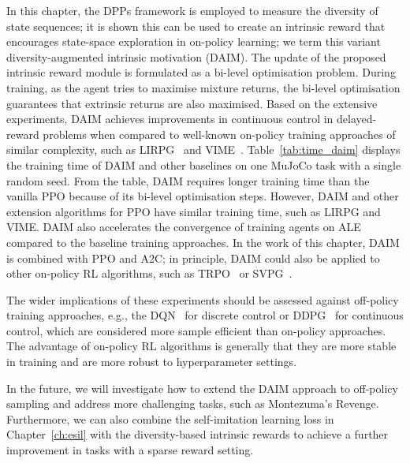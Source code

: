 In this chapter, the DPPs framework is employed to measure the diversity of state sequences; it is shown this can be used to create an intrinsic reward that encourages state-space exploration in on-policy learning; we term this variant diversity-augmented intrinsic motivation (DAIM). The update of the proposed intrinsic reward module is formulated as a bi-level optimisation problem. During training, as the agent tries to maximise mixture returns, the bi-level optimisation guarantees that extrinsic returns are also maximised. Based on the extensive experiments, DAIM achieves improvements in continuous control in delayed-reward problems when compared to well-known on-policy training approaches of similar complexity, such as LIRPG~\cite{zheng2018learning} and VIME~\cite{NIPS2016_abd81528}. Table~\ref{tab:time_daim} displays the training time of DAIM and other baselines on one MuJoCo task with a single random seed. From the table, DAIM requires longer training time than the vanilla PPO because of its bi-level optimisation steps. However, DAIM and other extension algorithms for PPO have similar training time, such as LIRPG and VIME. DAIM also accelerates the convergence of training agents on ALE compared to the baseline training approaches. In the work of this chapter, DAIM is combined with PPO and A2C; in principle, DAIM could also be applied to other on-policy RL algorithms, such as TRPO~\cite{schulman2015trust} or SVPG~\cite{liu2017stein}. 

The wider implications of these experiments should be assessed against off-policy training approaches, e.g., the DQN~\cite{mnih2015human} for discrete control or DDPG~\cite{lillicrap2015continuous} for continuous control, which are considered more sample efficient than on-policy approaches. The advantage of on-policy RL algorithms is generally that they are more stable in training and are more robust to hyperparameter settings.

In the future, we will investigate how to extend the DAIM approach to off-policy sampling and address more challenging tasks, such as Montezuma's Revenge. Furthermore, we can also combine the self-imitation learning loss in Chapter~\ref{ch:esil} with the diversity-based intrinsic rewards to achieve a further improvement in tasks with a sparse reward setting.
